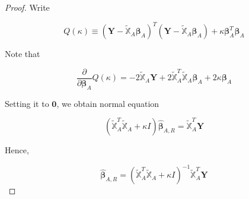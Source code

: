 \documentclass[]{book}
\theoremstyle{definition}
\theoremstyle{definition}
\theoremstyle{definition}
\theoremstyle{remark}
\let\BeginKnitrBlock\begin \let\EndKnitrBlock\end
\begin{document}
\BeginKnitrBlock{proof}
{}Write

\[Q(\kappa) \equiv (\mathbf{Y} - \widetilde{\mathbb{X}}_A \boldsymbol\beta_A)^T (\mathbf{Y} - \widetilde{\mathbb{X}}_A \boldsymbol\beta_A) + \kappa \boldsymbol\beta_A^T \boldsymbol\beta_A\]

Note that

\[
\frac{\partial}{\partial \boldsymbol\beta_A} Q(\kappa) = -2 \widetilde{\mathbb{X}}_A \mathbf{Y} + 2 \widetilde{\mathbb{X}}_A^T \widetilde{\mathbb{X}}_A \boldsymbol\beta_A + 2 \kappa \boldsymbol\beta_A
\]

Setting it to \(\mathbf{0}\), we obtain normal equation

\[(\widetilde{\mathbb{X}}_A^T \widetilde{\mathbb{X}}_A + \kappa I) \boldsymbol{\hat\beta}_{A, R} = \widetilde{\mathbb{X}}_A^T \mathbf{Y}\]

Hence,

\[\boldsymbol{\hat\beta}_{A, R} = (\widetilde{\mathbb{X}}_A^T \widetilde{\mathbb{X}}_A + \kappa I)^{-1}\widetilde{\mathbb{X}}_A^T \mathbf{Y}\]
\EndKnitrBlock{proof}


\end{document}
